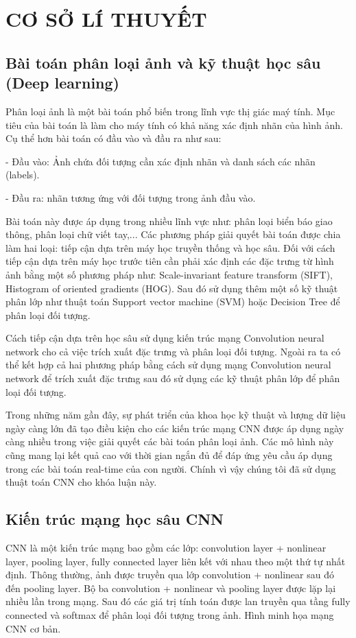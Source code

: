 
\chapter{CƠ SỞ LÍ THUYẾT}

\section{Bài toán phân loại ảnh và kỹ thuật học sâu (Deep learning)}
Phân loại ảnh là một bài toán phổ biến trong lĩnh vực thị giác maý tính. Mục tiêu của bài toán là làm cho máy tính có khả năng xác định nhãn của hình ảnh. Cụ thể hơn bài toán có đầu vào và đầu ra như sau:

- Đầu vào: Ảnh chứa đối tượng cần xác định nhãn và danh sách các nhãn (labels).

- Đầu ra: nhãn tương ứng với đối tượng trong ảnh đầu vào.

Bài toán này được áp dụng trong nhiều lĩnh vực như: phân loại biển báo giao thông, phân loại chữ viết tay,... Các phương pháp giải quyết bài toán được chia làm hai loại: tiếp cận dựa trên máy học truyền thống và học sâu. Đối với cách tiếp cận dựa trên máy học trước tiên cần phải xác định các đặc trưng từ hình ảnh bằng một số phương pháp như: Scale-invariant feature transform (SIFT), Histogram of oriented gradients (HOG). Sau đó sử dụng thêm một số kỹ thuật phân lớp như thuật toán Support vector machine (SVM) hoặc Decision Tree để phân loại đối tượng. 

Cách tiếp cận dựa trên học sâu sử dụng kiến trúc mạng Convolution neural network cho cả việc trích xuất đặc trưng và phân loại đối tượng. Ngoài ra ta có thể kết hợp cả hai phương pháp bằng cách sử dụng mạng Convolution neural network để trích xuất đặc trưng sau đó sử dụng các kỹ thuật phân lớp để phân loại đối tượng. 

Trong những năm gần đây, sự phát triển của khoa học kỹ thuật và lượng dữ liệu ngày càng lớn đã tạo điều kiện cho các kiến trúc mạng CNN được áp dụng ngày càng nhiều trong việc giải quyết các bài toán phân loại ảnh. Các mô hình này cũng mang lại kết quả cao với thời gian ngắn đủ để đáp ứng yêu cầu áp dụng trong các bài toán real-time của con người. Chính vì vậy chúng tôi đã sử dụng thuật toán CNN cho khóa luận này.

\section{Kiến trúc mạng học sâu CNN}
CNN là một kiến trúc mạng bao gồm các lớp: convolution layer + nonlinear layer, pooling layer, fully connected layer liên kết với nhau theo một thứ tự nhất định. Thông thường, ảnh được truyền qua lớp convolution + nonlinear sau đó đến pooling layer. Bộ ba convolution + nonlinear và pooling layer được lặp lại nhiều lần trong mạng. Sau đó các giá trị tính toán được lan truyền qua tầng fully connected và softmax để phân loại đối tượng trong ảnh. Hình minh họa mạng CNN cơ bản.

